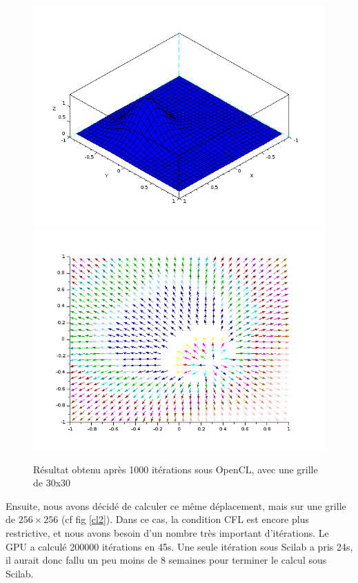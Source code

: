 \documentclass[12pt,a4paper,twoside]{article}
\begin{document}
\begin{figure}
\begin{center}
\includegraphics[scale=0.35]{Images/clrhoY30.png}
\includegraphics[scale=0.35]{Images/mapcl30.png}
\caption{Résultat obtenu après 1000 itérations sous OpenCL, avec une grille de 30x30}
\label{cl}
\end{center}
\end{figure}

Ensuite, nous avons décidé de calculer ce même déplacement, mais sur une grille de $256\times 256$ (cf fig \ref{cl2}). Dans ce cas, la condition CFL est encore plus restrictive, et nous avons besoin d'un nombre très important
d'itérations. Le GPU a calculé 200000 itérations en 45s. Une seule itération sous Scilab a pris 24s, il aurait donc 
fallu un peu moins de 8 semaines pour terminer le calcul sous Scilab.
\end{document}
